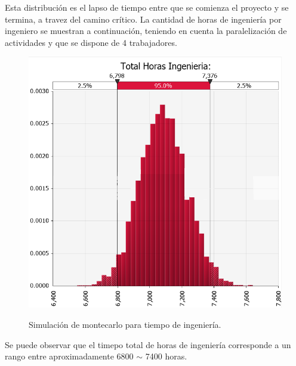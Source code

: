 Esta distribución es el lapso de tiempo entre que se comienza el proyecto y se termina, a travez del camino crítico. 
La cantidad de horas de ingeniería por ingeniero se muestran a continuación, teniendo en cuenta la paralelización de actividades y que se dispone de 4 trabajadores.
\begin{figure}[H]
	\centering
	\includegraphics[width=0.5\linewidth]{ImagenesFactibilidad/montecarlo_tiempo_largo}
	\label{fig:montecarlo_tiempos_ing}
	\caption{Simulación de montecarlo para tiempo de ingeniería.}
\end{figure}
Se puede observar que el timepo total de horas de ingeniería corresponde a un rango entre aproximadamente 6800 $\sim$ 7400 horas.